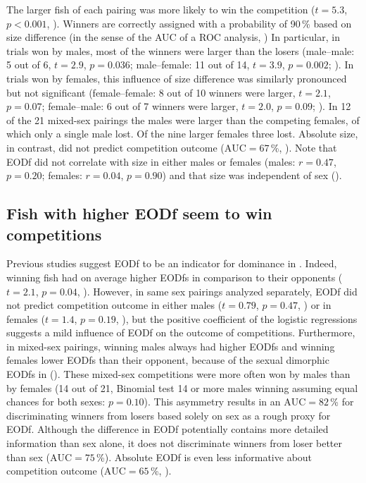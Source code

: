 The larger fish of each pairing was more likely to win the competition ($t=5.3$, $p<0.001$, ). Winners are correctly assigned with a probability of 90\,\% based on size difference (in the sense of the AUC of a ROC analysis, ) In particular, in trials won by males, most of the winners were larger than the losers (male--male: 5 out of 6, $t=2.9$, $p=0.036$; male--female: 11 out of 14, $t=3.9$, $p=0.002$; ). In trials won by females, this influence of size difference was similarly pronounced but not significant (female--female: 8 out of 10 winners were larger, $t=2.1$, $p=0.07$; female--male: 6 out of 7 winners were larger, $t=2.0$, $p=0.09$; ). In 12 of the 21 mixed-sex pairings the males were larger than the competing females, of which only a single male lost. Of the nine larger females three lost. Absolute size, in contrast, did not predict competition outcome ($\text{AUC}=67$\,\%, ). Note that EODf did not correlate with size in either males or females (males: $r=0.47$, $p=0.20$; females: $r=0.04$, $p=0.90$) and that size was independent of sex ().

\subsection{Fish with higher EODf seem to win competitions}

Previous studies suggest EODf to be an indicator for dominance in \lepto{} \citep{Dunlap2002, Henninger2018, Raab2019}. Indeed, winning fish had on average higher EODfs in comparison to their opponents ($t=2.1$, $p=0.04$, ). However, in same sex pairings analyzed separately, EODf did not predict competition outcome in either males ($t=0.79$, $p=0.47$, ) or in females ($t=1.4$, $p=0.19$, ), but the positive coefficient of the logistic regressions suggests a mild influence of EODf on the outcome of competitions. Furthermore, in mixed-sex pairings, winning males always had higher EODfs and winning females lower EODfs than their opponent, because of the sexual dimorphic EODfs in \lepto{} (). These mixed-sex competitions were more often won by males than by females (14 out of 21, Binomial test 14 or more males winning assuming equal chances for both sexes: $p=0.10$). This asymmetry results in an $\text{AUC}=82$\,\% for discriminating winners from losers based solely on sex as a rough proxy for EODf. Although the difference in EODf potentially contains more detailed information than sex alone, it does not discriminate winners from loser better than sex ($\text{AUC}=75$\,\%). Absolute EODf is even less informative about competition outcome ($\text{AUC}=65$\,\%, ).

